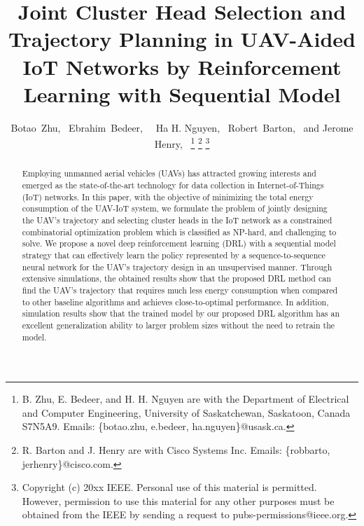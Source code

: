 \documentclass[journal]{IEEEtran}
\begin{document}
	\title{Joint Cluster Head Selection and Trajectory Planning in UAV-Aided IoT Networks by Reinforcement Learning with Sequential Model}	
	\author{Botao~Zhu,~\IEEEmembership{}
		Ebrahim~Bedeer,~
		~Ha H. Nguyen,~ Robert~Barton,~ and Jerome Henry,~
		\thanks{B. Zhu, E. Bedeer, and H. H. Nguyen are with the Department of Electrical and Computer Engineering, University of Saskatchewan, Saskatoon, Canada S7N5A9. Emails: \{botao.zhu, e.bedeer, ha.nguyen\}@usask.ca.}
		\thanks{R. Barton and J. Henry are with Cisco Systems Inc. Emails: \{robbarto, jerhenry\}@cisco.com.}
 		\thanks{Copyright (c) 20xx IEEE. Personal use of this material is permitted. However, permission to use this material for any other purposes must be obtained from the IEEE by sending a request to pubs-permissions@ieee.org.}
	}%
	
	
	\maketitle
	\begin{abstract}
			 Employing unmanned aerial vehicles (UAVs) has attracted growing interests and emerged as the state-of-the-art technology for data collection in Internet-of-Things (IoT) networks. In this paper, with the objective of minimizing the total energy consumption of the UAV-IoT system, we formulate the problem of jointly designing the UAV's trajectory and selecting cluster heads in the IoT network as a constrained combinatorial optimization problem which is classified as NP-hard, and challenging to solve. We propose a novel deep reinforcement learning (DRL) with a sequential model strategy that can effectively learn the policy represented by a sequence-to-sequence neural network for the UAV's trajectory design in an unsupervised manner. Through extensive simulations, the obtained results show that the proposed DRL method can find the UAV's trajectory that requires much less energy consumption when compared to other baseline algorithms and achieves close-to-optimal performance. In addition, simulation results show that the trained model by our proposed DRL algorithm has an excellent generalization ability to larger problem sizes without the need to retrain the model. 	
	\end{abstract}
	
\end{document}
